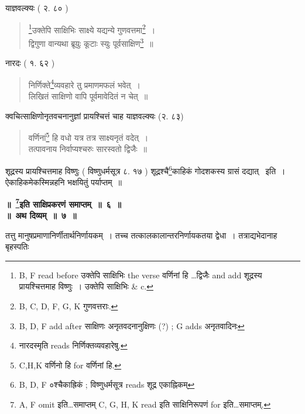 \documentclass[11pt, openany]{book}
\begin{document}
\newpage
{}

याज्ञवल्क्यः ( २. ८० )

\begin{quote}
{\vy \renewcommand{\thefootnote}{1}\footnote{B, F read before उक्तेपि साक्षिभिः the verse वर्णिनां हि \ldots द्विजैः and add शूद्रस्य प्रायश्चित्तमाह विष्णुः~। उक्तेपि साक्षिभिः \& c.}उक्तेपि साक्षिभिः साक्ष्ये यद्यन्ये गुणवत्तमा\renewcommand{\thefootnote}{2}\footnote{B, C, D, F, G, K गुणवत्तराः.}~।\\
द्विगुणा वान्यथा ब्रूयुः कूटाः स्युः पूर्वसाक्षिण\renewcommand{\thefootnote}{3}\footnote{B, D, F add after साक्षिणः {\qt  अनृतवदनानुक्षिणः} (?) ; G adds अनृतवादिनः}~॥}
\end{quote}

नारदः ( १. ६२ )

\begin{quote}
{\vy निर्णिक्ते\renewcommand{\thefootnote}{4}\footnote{नारदस्मृति reads {\qt निर्णिक्तव्यवहारेषु}.}व्यवहारे तु प्रमाणमफलं भवेत्~।\\
लिखितं साक्षिणो वापि पूर्वमावेदितं न चेत्~॥}
\end{quote}

क्वचित्साक्षिणोनृतवचनानुज्ञां प्रायश्चित्तं चाह याज्ञवल्क्यः (२. ८३)

\begin{quote}
{\vy वर्णिनां\renewcommand{\thefootnote}{5}\footnote{C,H,K वर्णिनो हि for वर्णिनां हि.} हि वधो यत्र तत्र साक्ष्यनृतं वदेत्~।\\
तत्पावनाय निर्वाप्यश्चरुः सारस्वतो द्विजैः~॥}
\end{quote}

शूद्रस्य प्रायश्चित्तमाह विष्णुः ( विष्णुधर्मसूत्र ८. १७ ) शूद्रश्चै\renewcommand{\thefootnote}{6}\footnote{B, D, F ०श्चैकाह्रिकं ; विष्णुधर्मसूत्र reads शूद्र एकाह्निकम्}काहिकं गोदशकस्य ग्रासं दद्यात् \textendash\ इति~। ऐकाहिकमेकस्मिन्नहनि भक्षयितुं पर्याप्तम्~॥

\begin{center}
\textbf{\Large ॥~\renewcommand{\thefootnote}{7}\footnote{A, F omit इति\ldots समाप्तम् C, G, H, K read इति साक्षिनिरूपणं for इति\ldots समाप्तम्.}इति साक्षिप्रकरणं समाप्तम्~॥~६~॥}\\

\vspace{2mm}
\textbf{\Large ॥~अथ दिव्यम्~॥~७~॥}
\end{center}

तत्तु मानुषप्रमाणानिर्णीतार्थनिर्णायकम्~। तच्च तत्कालकालान्तरनिर्णायकतया द्वेधा~। तत्राद्यभेदानाह बृहस्पतिः
\end{document}
